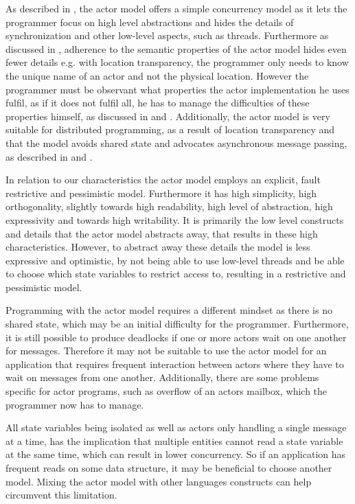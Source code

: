 As described in , the actor model offers a simple concurrency model as it lets the programmer focus on high level abstractions and hides the details of synchronization and other low-level aspects, such as threads. Furthermore as discussed in , adherence to the semantic properties of the actor model hides even fewer details e.g. with location transparency, the programmer only needs to know the unique name of an actor and not the physical location. However the programmer must be observant what properties the actor implementation he uses fulfil, as if it does not fulfil all, he has to manage the difficulties of these properties himself, as discussed in  and . Additionally, the actor model is very suitable for distributed programming, as a result of location transparency and that the model avoids shared state and advocates asynchronous message passing, as described in  and .

In relation to our characteristics the actor model employs an explicit, fault restrictive and pessimistic model. Furthermore it has high simplicity, high orthogonality, slightly towards high readability, high level of abstraction, high expressivity and towards high writability. It is primarily the low level constructs and details that the actor model abstracts away, that results in these high characteristics. However, to abstract away these details the model is less expressive and optimistic, by not being able to use low-level threads and be able to choose which state variables to restrict access to, resulting in a restrictive and pessimistic model.

Programming with the actor model requires a different mindset as there is no shared state, which may be an initial difficulty for the programmer. Furthermore, it is still possible to produce deadlocks if one or more actors wait on one another for messages. Therefore it may not be suitable to use the actor model for an application that requires frequent interaction between actors where they have to wait on messages from one another. Additionally, there are some problems specific for actor programs, such as overflow of an actors mailbox, which the programmer now has to manage. 

All state variables being isolated as well as actors only handling a single message at a time, has the implication that multiple entities cannot read a state variable at the same time, which can result in lower concurrency. So if an application has frequent reads on some data structure, it may be beneficial to choose another model. Mixing the actor model with other languages constructs can help circumvent this limitation.%

